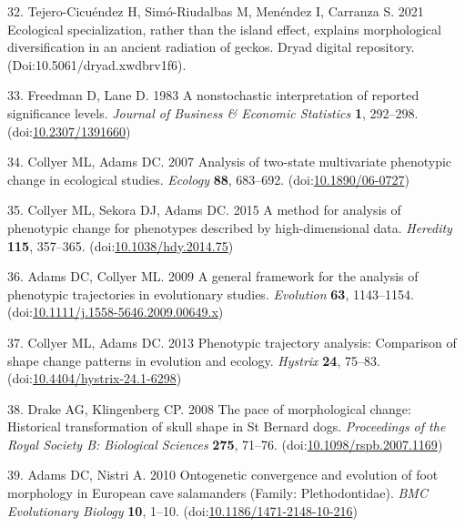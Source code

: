 \documentclass[
  11pt,
]{article}
\begin{document}
\leavevmode\hypertarget{ref-PristurusData}{}%
32. Tejero-Cicuéndez H, Simó-Riudalbas M, Menéndez I, Carranza S. 2021
Ecological specialization, rather than the island effect, explains
morphological diversification in an ancient radiation of geckos. Dryad
digital repository. (Doi:10.5061/dryad.xwdbrv1f6).

\leavevmode\hypertarget{ref-Freedman1983}{}%
33. Freedman D, Lane D. 1983 A nonstochastic interpretation of reported
significance levels. \emph{Journal of Business \& Economic Statistics}
\textbf{1}, 292--298.
(doi:\href{https://doi.org/10.2307/1391660}{10.2307/1391660})

\leavevmode\hypertarget{ref-CollyerAdams2007}{}%
34. Collyer ML, Adams DC. 2007 Analysis of two-state multivariate
phenotypic change in ecological studies. \emph{Ecology} \textbf{88},
683--692. (doi:\href{https://doi.org/10.1890/06-0727}{10.1890/06-0727})

\leavevmode\hypertarget{ref-Collyer_et_al2015}{}%
35. Collyer ML, Sekora DJ, Adams DC. 2015 A method for analysis of
phenotypic change for phenotypes described by high-dimensional data.
\emph{Heredity} \textbf{115}, 357--365.
(doi:\href{https://doi.org/10.1038/hdy.2014.75}{10.1038/hdy.2014.75})

\leavevmode\hypertarget{ref-AdamsCollyer2009}{}%
36. Adams DC, Collyer ML. 2009 A general framework for the analysis of
phenotypic trajectories in evolutionary studies. \emph{Evolution}
\textbf{63}, 1143--1154.
(doi:\href{https://doi.org/10.1111/j.1558-5646.2009.00649.x}{10.1111/j.1558-5646.2009.00649.x})

\leavevmode\hypertarget{ref-CollyerAdams2013}{}%
37. Collyer ML, Adams DC. 2013 Phenotypic trajectory analysis:
Comparison of shape change patterns in evolution and ecology.
\emph{Hystrix} \textbf{24}, 75--83.
(doi:\href{https://doi.org/10.4404/hystrix-24.1-6298}{10.4404/hystrix-24.1-6298})

\leavevmode\hypertarget{ref-DrakeKlingenberg2008}{}%
38. Drake AG, Klingenberg CP. 2008 The pace of morphological change:
Historical transformation of skull shape in St Bernard dogs.
\emph{Proceedings of the Royal Society B: Biological Sciences}
\textbf{275}, 71--76.
(doi:\href{https://doi.org/10.1098/rspb.2007.1169}{10.1098/rspb.2007.1169})

\leavevmode\hypertarget{ref-AdamsNistri2010}{}%
39. Adams DC, Nistri A. 2010 Ontogenetic convergence and evolution of
foot morphology in European cave salamanders (Family: Plethodontidae).
\emph{BMC Evolutionary Biology} \textbf{10}, 1--10.
(doi:\href{https://doi.org/10.1186/1471-2148-10-216}{10.1186/1471-2148-10-216})
\end{document}
